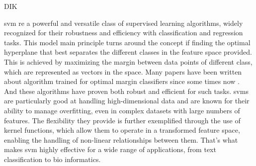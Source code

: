 DIK\documentclass[../../../main.tex]{subfiles}
\begin{document}
\acrfull{svm} re a powerful and versatile class of supervised learning algorithms, widely recognized for their robustness and efficiency with classification and regression tasks.
This model main principle turns around the concept if finding the optimal hyperplane that best separates the different classes in the feature space provided.
This is achieved by maximizing the margin between data points of different class, which are represented as vectors in the space. 
Many papers have been written about algorithm trained for optimal margin classifiers since some times now \cite{boser_training_1992}. And these algorithms have proven both robust and efficient for such tasks.  
\acrshort{svm}s are particularly good at handling high-dimensional data and are known for their ability to manage overfitting, even in complex datasets with large numbers of features.
The flexibility they provide is further exemplified through the use of kernel functions, which allow them to operate in a transformed feature space, enabling the handling of non-linear relationships between them. That's what makes \acrshort{svm} highly effective for a wide range of applications, from text classification to bio informatics. 
\end{document}
